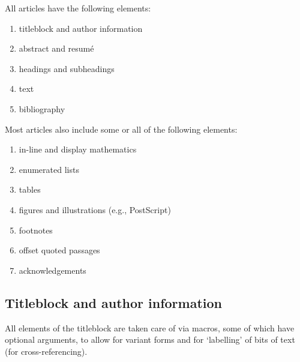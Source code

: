 All articles have the following elements:

\begin{enumerate} \itemsep=0pt
   \item titleblock and author information 

   \item abstract and resum\'e

   \item headings and subheadings

   \item text

   \item bibliography
\end{enumerate}

\noindent Most articles also include some or all of the following
elements: 

\begin{enumerate} \itemsep=0pt
   \item in-line and display mathematics 

   \item enumerated lists

   \item tables

   \item figures and illustrations (e.g., PostScript)

   \item footnotes

   \item offset quoted passages

   \item acknowledgements
\end{enumerate}


\subsection{Titleblock and author information}

All elements of the titleblock are taken care of via macros, some of
which have optional arguments, to allow for variant forms and for
`labelling' of bits of text (for cross-referencing).


